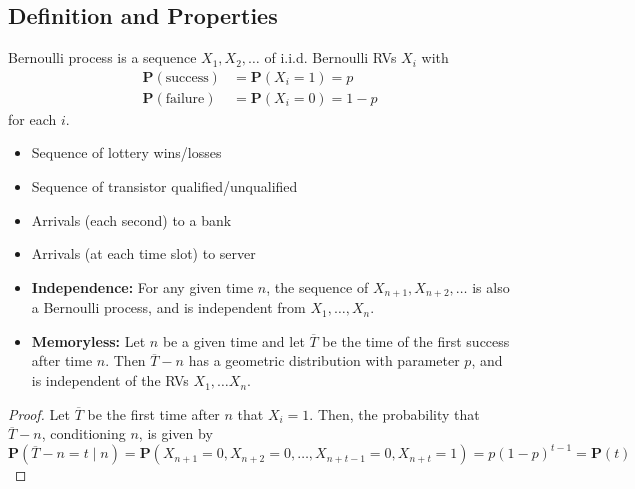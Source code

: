\subsection{Definition and Properties}
\begin{definition}
    Bernoulli process is a sequence $X_1, X_2, \ldots$ of i.i.d. Bernoulli RVs $X_i$ with
    \begin{equation}
    \begin{aligned}
        \mathbf{P}(\text{success}) &= \mathbf{P}(X_i = 1) = p \\ 
        \mathbf{P}(\text{failure}) &= \mathbf{P}(X_i = 0) = 1 - p 
    \end{aligned}
    \end{equation}
    for each $i$.
\end{definition}
\begin{example}
    \begin{itemize}
        \item Sequence of lottery wins/losses
        \item Sequence of transistor qualified/unqualified
        \item Arrivals (each second) to a bank
        \item Arrivals (at each time slot) to server
    \end{itemize}
\end{example}
\begin{property}
    \begin{itemize}
        \item \textbf{Independence:} For any given time $n$, the sequence of $X_{n+1}, X_{n+2}, \ldots$ is also a Bernoulli process, and is independent from $X_1, \ldots , X_n$.
        \item \textbf{Memoryless:}  Let $n$ be a given time and let $\overline{T}$ be the time of the first success after time $n$. Then $\overline{T} - n$ has a geometric distribution with parameter $p$, and is independent of the RVs $X_1, \ldots X_n$.
    \end{itemize}
\end{property}
\begin{proof}
    Let $\overline{T}$ be the first time after $n$ that $X_i = 1$. Then, the probability that $\overline{T} - n$, conditioning $n$, is given by
    \begin{equation}
        \mathbf{P}(\overline{T} - n = t \mid n) = \mathbf{P}(X_{n+1} = 0, X_{n+2} = 0, \ldots, X_{n+t-1} = 0, X_{n+t} = 1) = p(1-p)^{t-1} = \mathbf{P}(t)
    \end{equation}
\end{proof}

